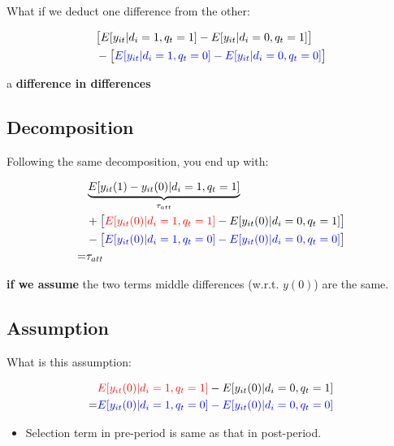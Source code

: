 \documentclass[
  letterpaper,
  DIV=11,
  numbers=noendperiod]{scrartcl}
\providecommand{\tightlist}{%
  \setlength{\itemsep}{0pt}\setlength{\parskip}{0pt}}
\begin{document}
\subsection{}\label{section-4}

What if we deduct one difference from the other:

\[
  \begin{aligned}
  &\big[E[y_{it} | d_i =1, q_t = 1]-E[y_{it} | d_i =0, q_t = 1]\big] \\
  &-\big[\textcolor{blue}{E[y_{it} | d_i =1, q_t = 0]-E[y_{it} | d_i =0, q_t = 0]}\big] 
  \end{aligned}
\]

a \textbf{difference in differences}

\subsection{Decomposition}\label{decomposition-1}

Following the same decomposition, you end up with:

\[
  \begin{aligned}
   & \underbrace{E[y_{it}(1)-y_{it}(0) | d_i =1, q_t = 1]}_{\tau_{att}} \\
  &+\big[\textcolor{red}{E[y_{it}(0) | d_i =1, q_t = 1]} -E[y_{it}(0) | d_i =0, q_t = 1]\big] \\
  &-\big[\textcolor{blue}{E[y_{it}(0) | d_i =1, q_t = 0]-E[y_{it}(0) | d_i =0, q_t = 0]}\big] \\
  =& \tau_{att}
  \end{aligned}
\]

\textbf{if we assume} the two terms middle differences (w.r.t. \(y(0)\))
are the same.

\subsection{Assumption}\label{assumption}

What is this assumption:

\[
  \begin{aligned}
   &\textcolor{red}{E[y_{it}(0) | d_i =1, q_t = 1]} -E[y_{it}(0) | d_i =0, q_t = 1] \\
  =&\textcolor{blue}{E[y_{it}(0) | d_i =1, q_t = 0]-E[y_{it}(0) | d_i =0, q_t = 0]}
  \end{aligned}
\]

\begin{itemize}
\tightlist
\item
  Selection term in pre-period is same as that in post-period.
\end{itemize}
\end{document}
